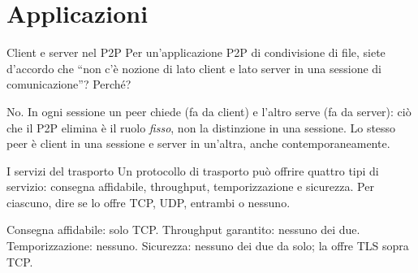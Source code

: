 \section{Applicazioni}

\begin{esercizio}{Client e server nel P2P}
Per un'applicazione P2P di condivisione di file, siete d'accordo che ``non c'è nozione di lato client e lato server in una sessione di
comunicazione''? Perché?

\svolgimento
No. In ogni sessione un peer chiede (fa da client) e l'altro serve (fa da server): ciò che il P2P elimina è il ruolo \emph{fisso}, non
la distinzione in una sessione. Lo stesso peer è client in una sessione e server in un'altra, anche contemporaneamente.
\end{esercizio}

\begin{esercizio}{I servizi del trasporto}
Un protocollo di trasporto può offrire quattro tipi di servizio: consegna affidabile, throughput, temporizzazione e sicurezza. Per
ciascuno, dire se lo offre TCP, UDP, entrambi o nessuno.

\svolgimento
Consegna affidabile: solo TCP. Throughput garantito: nessuno dei due. Temporizzazione: nessuno. Sicurezza: nessuno dei due da solo; la
offre TLS sopra TCP.
\end{esercizio}


